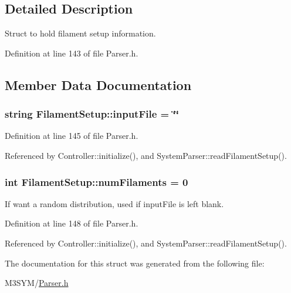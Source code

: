 \subsection{Detailed Description}
Struct to hold filament setup information. 

Definition at line 143 of file Parser.\+h.



\subsection{Member Data Documentation}
\hypertarget{structFilamentSetup_a242b250121191fe69bceeb99a32de4f7}{
\subsubsection[{input\+File}]{\setlength{\rightskip}{0pt plus 5cm}string Filament\+Setup\+::input\+File = \char`\"{}\char`\"{}}}\label{structFilamentSetup_a242b250121191fe69bceeb99a32de4f7}


Definition at line 145 of file Parser.\+h.



Referenced by Controller\+::initialize(), and System\+Parser\+::read\+Filament\+Setup().

\hypertarget{structFilamentSetup_a0919341034ce0626e2de5fef2e7a6b66}{
\subsubsection[{num\+Filaments}]{\setlength{\rightskip}{0pt plus 5cm}int Filament\+Setup\+::num\+Filaments = 0}}\label{structFilamentSetup_a0919341034ce0626e2de5fef2e7a6b66}


If want a random distribution, used if input\+File is left blank. 



Definition at line 148 of file Parser.\+h.



Referenced by Controller\+::initialize(), and System\+Parser\+::read\+Filament\+Setup().



The documentation for this struct was generated from the following file\+:\begin{DoxyCompactItemize}
\item 
M3\+S\+Y\+M/\hyperlink{Parser_8h}{Parser.\+h}\end{DoxyCompactItemize}

